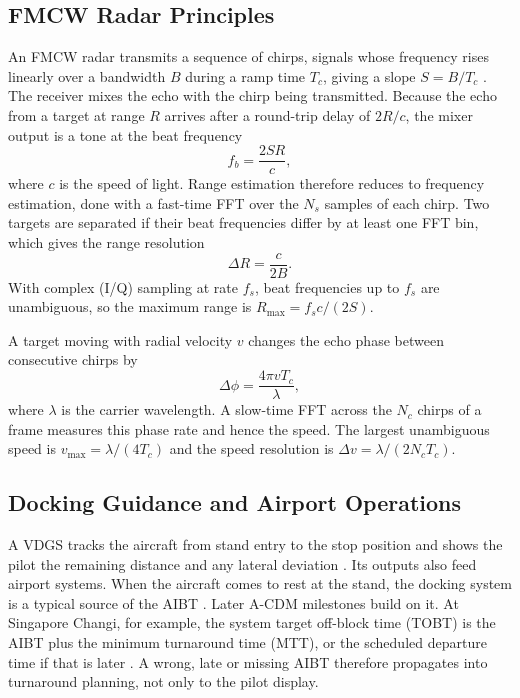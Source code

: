 \documentclass[conference]{IEEEtran}
\begin{document}
\subsection{FMCW Radar Principles}
An FMCW radar transmits a sequence of chirps, signals whose frequency rises linearly over a bandwidth $B$ during a ramp time $T_c$, giving a slope $S = B/T_c$ \cite{rao_ti_fmcw}. The receiver mixes the echo with the chirp being transmitted. Because the echo from a target at range $R$ arrives after a round-trip delay of $2R/c$, the mixer output is a tone at the beat frequency
\begin{equation}
  f_b = \frac{2 S R}{c},
  \label{eq:beat}
\end{equation}
where $c$ is the speed of light. Range estimation therefore reduces to frequency estimation, done with a fast-time FFT over the $N_s$ samples of each chirp. Two targets are separated if their beat frequencies differ by at least one FFT bin, which gives the range resolution
\begin{equation}
  \Delta R = \frac{c}{2B}.
  \label{eq:rres}
\end{equation}
With complex (I/Q) sampling at rate $f_s$, beat frequencies up to $f_s$ are unambiguous, so the maximum range is $R_{\max} = f_s c / (2S)$.

A target moving with radial velocity $v$ changes the echo phase between consecutive chirps by
\begin{equation}
  \Delta\phi = \frac{4\pi v T_c}{\lambda},
  \label{eq:doppler}
\end{equation}
where $\lambda$ is the carrier wavelength. A slow-time FFT across the $N_c$ chirps of a frame measures this phase rate and hence the speed. The largest unambiguous speed is $v_{\max} = \lambda/(4T_c)$ and the speed resolution is $\Delta v = \lambda/(2 N_c T_c)$.

\subsection{Docking Guidance and Airport Operations}
A VDGS tracks the aircraft from stand entry to the stop position and shows the pilot the remaining distance and any lateral deviation \cite{us6762694}. Its outputs also feed airport systems. When the aircraft comes to rest at the stand, the docking system is a typical source of the AIBT \cite{icao_acdm,schiphol_acdm}. Later A-CDM milestones build on it. At Singapore Changi, for example, the system target off-block time (TOBT) is the AIBT plus the minimum turnaround time (MTT), or the scheduled departure time if that is later \cite{caas_acdm}. A wrong, late or missing AIBT therefore propagates into turnaround planning, not only to the pilot display.
\end{document}
